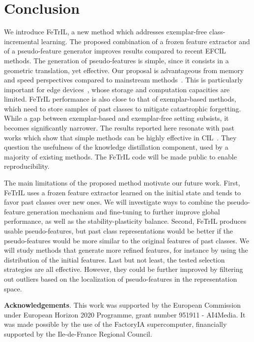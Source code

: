 \documentclass[10pt,twocolumn,letterpaper]{article}
\makeatletter
\newcommand{\ourmodel}{FeTrIL\@\xspace}
\makeatother
\begin{document}
\section{Conclusion}
\label{sec:conclusions}
We introduce \ourmodel, a new method which addresses exemplar-free class-incremental learning. 
The proposed combination of a frozen feature extractor and of a pseudo-feature generator improves results compared to recent EFCIL methods.
The generation of pseudo-features is simple, since it consists in a geometric translation, yet effective.
Our proposal is advantageous from memory and speed perspectives compared to mainstream methods~\cite{hou2019_lucir,rebuffi2017_icarl,smith2021always,kumar2021_efficient,sdc_2020,zhu2021class,zhu2021pass,zhu2022self}.
This is particularly important for edge devices~\cite{hayes2022online,ravaglia2021tinyml}, whose storage and computation capacities are limited.
\ourmodel performance is also close to that of exemplar-based methods, which need to store samples of past classes to mitigate catastrophic forgetting.
While a gap between exemplar-based and exemplar-free setting subsists, it becomes significantly narrower. 
The results reported here resonate with past works which show that simple methods can be highly effective in CIL~\cite{belouadah2021_study,masana2021_study,prabhu2020gdumb}.
They question the usefulness of the knowledge distillation component, used by a majority of existing methods.
The \ourmodel code will be made public to enable reproducibility. 

The main limitations of the proposed method motivate our future work.
First, \ourmodel uses a frozen feature extractor learned on the initial state and tends to favor past classes over new ones. 
We will investigate ways to combine the pseudo-feature generation mechanism and fine-tuning to further improve global performance, as well as the stability-plasticity balance.
Second, \ourmodel produces usable pseudo-features, but past class representations would be better if the pseudo-features would be more similar to the original features of past classes. 
We will study methods that generate more refined features, for instance by using the distribution of the initial features.
Last but not least, the tested selection strategies are all effective.
However, they could be further improved by filtering out outliers based on the localization of pseudo-features in the representation space. 

\noindent \textbf{Acknowledgements}.
This work was supported by the European Commission under European Horizon 2020 Programme, grant number 951911 - AI4Media. It was made possible by the use of the FactoryIA supercomputer, financially supported by the Ile-de-France Regional Council.






{\small


}
\end{document}
